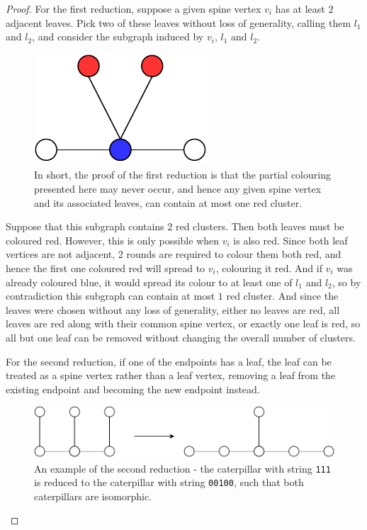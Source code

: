 \documentclass{mpaper}
\begin{document}
\begin{proof}

For the first reduction, suppose a given spine vertex $v_i$ has at least $2$ adjacent leaves. Pick two of these leaves without loss of generality, calling them $l_1$ and $l_2$, and consider the subgraph induced by $v_i$, $l_1$ and $l_2$.

\begin{figure}
    \centering
    \includegraphics{mpaper/figures/CaterpillarReduction.pdf}
    \caption{In short, the proof of the first reduction is that the partial colouring presented here may never occur, and hence any given spine vertex and its associated leaves, can contain at most one red cluster.}
    \label{fig/caterpillar-reduction-1}
\end{figure}

Suppose that this subgraph contains $2$ red clusters. Then both leaves must be coloured red. However, this is only possible when $v_i$ is also red. Since both leaf vertices are not adjacent, 2 rounds are required to colour them both red, and hence the first one coloured red will spread to $v_i$, colouring it red. And if $v_i$ was already coloured blue, it would spread its colour to at least one of $l_1$ and $l_2$, so by contradiction this subgraph can contain at most $1$ red cluster. And since the leaves were chosen without any loss of generality, either no leaves are red, all leaves are red along with their common spine vertex, or exactly one leaf is red, so all but one leaf can be removed without changing the overall number of clusters.

For the second reduction, if one of the endpoints has a leaf, the leaf can be treated as a spine vertex rather than a leaf vertex, removing a leaf from the existing endpoint and becoming the new endpoint instead.

\begin{figure}
    \centering
    \includegraphics[scale=0.5]{mpaper/figures/CaterpillarReduction2.pdf}
    \caption{An example of the second reduction - the caterpillar with string \texttt{111} is reduced to the caterpillar with string \texttt{00100}, such that both caterpillars are isomorphic.}
    \label{fig/caterpillar-reduction-2}
\end{figure}
\end{proof}
\end{document}
